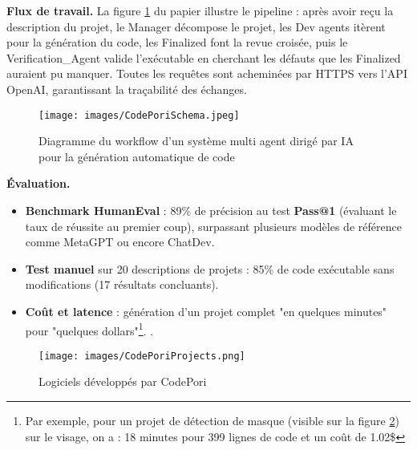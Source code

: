 \textbf{Flux de travail.}
La figure \ref{fig:schemaCodePori} du papier illustre le pipeline : après avoir reçu la description du projet, le Manager décompose le projet, les Dev agents itèrent pour la génération du code, les Finalized font la revue croisée, puis le Verification\_Agent valide l’exécutable en cherchant les défauts que les Finalized auraient pu manquer. Toutes les requêtes sont acheminées par HTTPS vers l’API OpenAI, garantissant la traçabilité des échanges.

\begin{figure}[H]
    \centering
    \texttt{[image: images/CodePoriSchema.jpeg]}
    \caption{Diagramme du workflow d'un système multi agent dirigé par IA pour la génération automatique de code \parencite{rasheed_codepori_2024}}
    \label{fig:schemaCodePori}
\end{figure}

\textbf{Évaluation.}
\begin{itemize}
  \item \textbf{Benchmark HumanEval} : 89\% de précision au test \textbf{Pass@1} (évaluant le taux de réussite au premier coup), surpassant plusieurs modèles de référence comme MetaGPT ou encore ChatDev.
  \item \textbf{Test manuel} sur 20 descriptions de projets : 85\% de code exécutable sans modifications (17 résultats concluants).
  \item \textbf{Coût et latence} : génération d’un projet complet "en quelques minutes" pour "quelques dollars"\footnote{Par exemple, pour un projet de détection de masque (visible sur la figure \ref{fig:projetsCodePori}) sur le visage, on a : 18 minutes pour 399 lignes de code et un coût de 1.02\$}. \cite{rasheed_codepori_2024}.
\end{itemize}

%

\begin{figure}[H]
    \centering
    \texttt{[image: images/CodePoriProjects.png]}
    \caption{Logiciels développés par CodePori \parencite{rasheed_codepori_2024}}
    \label{fig:projetsCodePori}
\end{figure}

